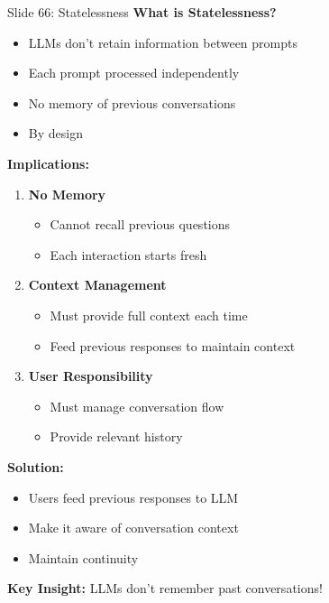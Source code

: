 \documentclass[8pt]{beamer}
\begin{document}
	\begin{frame}{Slide 66: Statelessness}
		\fontsize{6.5}{7.5}\selectfont
		\textbf{What is Statelessness?}
		\begin{itemize}
			\item LLMs don't retain information between prompts
			\item Each prompt processed independently
			\item No memory of previous conversations
			\item By design
		\end{itemize}
		
		\vspace{0.1cm}
		\textbf{Implications:}
		\begin{enumerate}
			\item \textbf{No Memory}
			\begin{itemize}
				\item Cannot recall previous questions
				\item Each interaction starts fresh
			\end{itemize}
			\item \textbf{Context Management}
			\begin{itemize}
				\item Must provide full context each time
				\item Feed previous responses to maintain context
			\end{itemize}
			\item \textbf{User Responsibility}
			\begin{itemize}
				\item Must manage conversation flow
				\item Provide relevant history
			\end{itemize}
		\end{enumerate}
		
		\vspace{0.1cm}
		\textbf{Solution:}
		\begin{itemize}
			\item Users feed previous responses to LLM
			\item Make it aware of conversation context
			\item Maintain continuity
		\end{itemize}
		
		\textcolor{myblue}{\textbf{Key Insight:}} LLMs don't remember past conversations!
	\end{frame}
	
\end{document}
